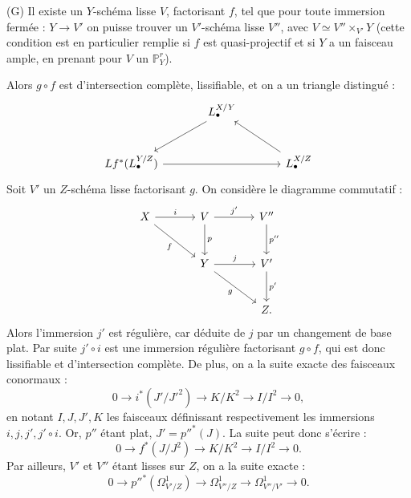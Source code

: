 (G) Il
existe un $Y$-schéma lisse $V$, factorisant $f$, tel que pour toute immersion fermée : $Y\to V'$ on puisse trouver un $V'$-schéma lisse $V''$, avec $V\simeq V''\times_{V'}Y$ (cette condition est en particulier remplie si $f$ est quasi-projectif et si $Y$ a un faisceau ample, en prenant pour $V$ un $\mathbb P^r_Y$).

Alors $g\circ f$ est d'intersection complète, lissifiable, et on a un triangle distingué :
\[
\begin{tikzcd}[column sep=large,row sep=large]
& L^{X/Y}_\bullet \arrow[dl] \\
Lf^*(L^{Y/Z}_\bullet) \arrow[rr] && L^{X/Z}_\bullet \arrow[ul]
\end{tikzcd}
\]
Soit $V'$ un $Z$-schéma lisse factorisant $g$. On considère le diagramme commutatif :
\[
\begin{tikzcd}[column sep=large,row sep=large]
X \arrow[r,"i"] \arrow[dr,"f"'] & V \arrow[r,"j'"] \arrow[d,"p"] & V'' \arrow[d,"p''"]\\
& Y \arrow[r,"j"] \arrow[dr,"g"'] & V' \arrow[d,"p'"]\\
& & Z .
\end{tikzcd}
\]
Alors l'immersion $j'$ est régulière, car déduite de $j$ par un changement de base plat. Par suite $j'\circ i$ est une immersion régulière factorisant $g\circ f$, qui est donc lissifiable et d'intersection complète. De plus, on a la suite exacte des faisceaux conormaux :
\[
0\longrightarrow i^*(J'/J'^2)\longrightarrow K/K^2\longrightarrow I/I^2\longrightarrow0,
\]
en notant $I,J,J',K$ les faisceaux définissant respectivement les immersions $i,j,j',j'\circ i$. Or, $p''$ étant plat, $J'=p''^*(J)$. La suite peut donc s'écrire :
\begin{equation}\tag{2.6.1}
0\longrightarrow f^*(J/J^2)\longrightarrow K/K^2\longrightarrow I/I^2\longrightarrow0.
\end{equation}
Par ailleurs, $V'$ et $V''$ étant lisses sur $Z$, on a la suite exacte :
\[
0\longrightarrow p''^*(\Omega^1_{V'/Z})\longrightarrow\Omega^1_{V''/Z}\longrightarrow\Omega^1_{V''/V'}\longrightarrow0.
\]
